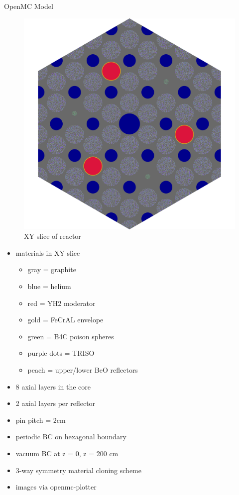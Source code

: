 \documentclass[9pt,t,aspectratio=169]{beamer}
\begin{document}
\begin{frame}{OpenMC Model}
\begin{minipage}[t]{0.35\linewidth}
\begin{figure}
            \includegraphics[height=0.7\textheight]{figures/gcmr_slice.png}
            \caption{XY slice of reactor}
        \end{figure}
    \end{minipage}
    \hfill%
    \begin{minipage}[t]{0.4\linewidth}
        \begin{itemize}
        \vspace*{-0.25cm}
        \item materials in XY slice
        \begin{itemize}
            \item gray = graphite
            \item blue = helium
            \item red = YH2 moderator
            \item gold = FeCrAL envelope
            \item green = B4C poison spheres
            \item purple dots = TRISO
            \item peach = upper/lower BeO reflectors
        \end{itemize}
        \item 8 axial layers in the core
        \item 2 axial layers per reflector
        \item pin pitch = 2cm
        \item periodic BC on hexagonal boundary
        \item vacuum BC at z = 0, z = 200 cm
        \item 3-way symmetry material cloning scheme
        \item images via openmc-plotter
        \end{itemize}
    \end{minipage}
\end{frame}
\end{document}
